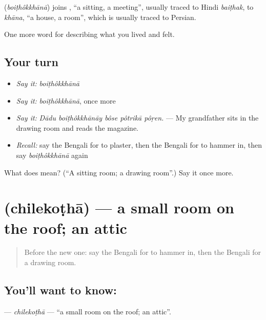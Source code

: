 \begin{cousinweb}
\textbf{} (\emph{boiṭhôkkhānā}) joins , \textquotedblleft{}a sitting, a meeting\textquotedblright{}, usually traced to Hindi \emph{baiṭhak}, to \emph{khāna}, \textquotedblleft{}a house, a room\textquotedblright{}, which is usually traced to Persian.
\end{cousinweb}

\begin{grammarlens}[title={What you've built}]
One more word for describing what you lived and felt.
\end{grammarlens}

\subsection*{Your turn}
\begin{itemize}
\raggedright
  \item \emph{Say it:} \emph{boiṭhôkkhānā}
  \item \emph{Say it:} \emph{boiṭhôkkhānā}, once more
  \item \emph{Say it:} \emph{Dādu boiṭhôkkhānāy bôse pôtrikā pôṛen.} — My grandfather sits in the drawing room and reads the magazine.
  \item \emph{Recall:} say the Bengali for to plaster, then the Bengali for to hammer in, then say \emph{boiṭhôkkhānā} again
\end{itemize}

\begin{tcolorbox}[breakable,colback=teal!4,colframe=teal!35!black,title={Before you move on}]
What does  mean? (\textquotedblleft{}A sitting room; a drawing room\textquotedblright{}.) Say it once more.
\end{tcolorbox}
\section[\texorpdfstring{\bn{চিলেকোঠা} (chilekoṭhā)}{চিলেকোঠা (chilekoṭhā)}]{ (chilekoṭhā) — a small room on the roof; an attic}

\label{lesson:BN-C508-chilekotha}



\begin{quote}
Before the new one: say the Bengali for to hammer in, then the Bengali for a drawing room.
\end{quote}

\subsection*{You'll want to know: }
\textbf{} — \emph{chilekoṭhā} — \textquotedblleft{}a small room on the roof; an attic\textquotedblright{}.

